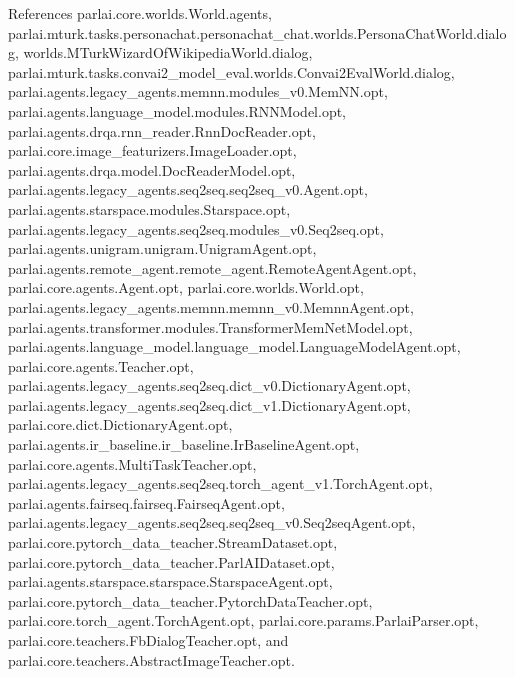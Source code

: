References parlai.\+core.\+worlds.\+World.\+agents, parlai.\+mturk.\+tasks.\+personachat.\+personachat\+\_\+chat.\+worlds.\+Persona\+Chat\+World.\+dialog, worlds.\+M\+Turk\+Wizard\+Of\+Wikipedia\+World.\+dialog, parlai.\+mturk.\+tasks.\+convai2\+\_\+model\+\_\+eval.\+worlds.\+Convai2\+Eval\+World.\+dialog, parlai.\+agents.\+legacy\+\_\+agents.\+memnn.\+modules\+\_\+v0.\+Mem\+N\+N.\+opt, parlai.\+agents.\+language\+\_\+model.\+modules.\+R\+N\+N\+Model.\+opt, parlai.\+agents.\+drqa.\+rnn\+\_\+reader.\+Rnn\+Doc\+Reader.\+opt, parlai.\+core.\+image\+\_\+featurizers.\+Image\+Loader.\+opt, parlai.\+agents.\+drqa.\+model.\+Doc\+Reader\+Model.\+opt, parlai.\+agents.\+legacy\+\_\+agents.\+seq2seq.\+seq2seq\+\_\+v0.\+Agent.\+opt, parlai.\+agents.\+starspace.\+modules.\+Starspace.\+opt, parlai.\+agents.\+legacy\+\_\+agents.\+seq2seq.\+modules\+\_\+v0.\+Seq2seq.\+opt, parlai.\+agents.\+unigram.\+unigram.\+Unigram\+Agent.\+opt, parlai.\+agents.\+remote\+\_\+agent.\+remote\+\_\+agent.\+Remote\+Agent\+Agent.\+opt, parlai.\+core.\+agents.\+Agent.\+opt, parlai.\+core.\+worlds.\+World.\+opt, parlai.\+agents.\+legacy\+\_\+agents.\+memnn.\+memnn\+\_\+v0.\+Memnn\+Agent.\+opt, parlai.\+agents.\+transformer.\+modules.\+Transformer\+Mem\+Net\+Model.\+opt, parlai.\+agents.\+language\+\_\+model.\+language\+\_\+model.\+Language\+Model\+Agent.\+opt, parlai.\+core.\+agents.\+Teacher.\+opt, parlai.\+agents.\+legacy\+\_\+agents.\+seq2seq.\+dict\+\_\+v0.\+Dictionary\+Agent.\+opt, parlai.\+agents.\+legacy\+\_\+agents.\+seq2seq.\+dict\+\_\+v1.\+Dictionary\+Agent.\+opt, parlai.\+core.\+dict.\+Dictionary\+Agent.\+opt, parlai.\+agents.\+ir\+\_\+baseline.\+ir\+\_\+baseline.\+Ir\+Baseline\+Agent.\+opt, parlai.\+core.\+agents.\+Multi\+Task\+Teacher.\+opt, parlai.\+agents.\+legacy\+\_\+agents.\+seq2seq.\+torch\+\_\+agent\+\_\+v1.\+Torch\+Agent.\+opt, parlai.\+agents.\+fairseq.\+fairseq.\+Fairseq\+Agent.\+opt, parlai.\+agents.\+legacy\+\_\+agents.\+seq2seq.\+seq2seq\+\_\+v0.\+Seq2seq\+Agent.\+opt, parlai.\+core.\+pytorch\+\_\+data\+\_\+teacher.\+Stream\+Dataset.\+opt, parlai.\+core.\+pytorch\+\_\+data\+\_\+teacher.\+Parl\+A\+I\+Dataset.\+opt, parlai.\+agents.\+starspace.\+starspace.\+Starspace\+Agent.\+opt, parlai.\+core.\+pytorch\+\_\+data\+\_\+teacher.\+Pytorch\+Data\+Teacher.\+opt, parlai.\+core.\+torch\+\_\+agent.\+Torch\+Agent.\+opt, parlai.\+core.\+params.\+Parlai\+Parser.\+opt, parlai.\+core.\+teachers.\+Fb\+Dialog\+Teacher.\+opt, and parlai.\+core.\+teachers.\+Abstract\+Image\+Teacher.\+opt.

\mbox{\label{classworlds_1_1MTurkWizardOfWikipediaWorld_aae637ce288e90d30e654557b0b2165f8}} 
